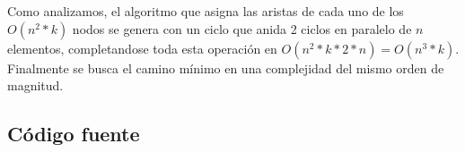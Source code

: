 Como analizamos, el algoritmo que asigna las aristas de cada uno de los $O(n^2*k)$ nodos se genera con un ciclo que anida 2 ciclos en paralelo de $n$ elementos, completandose toda esta operaci\'on en $O(n^2*k*2*n) = O(n^3*k)$. Finalmente se busca el camino m\'inimo en una complejidad del mismo orden de magnitud.

\newpage
\subsection{C\'odigo fuente}

